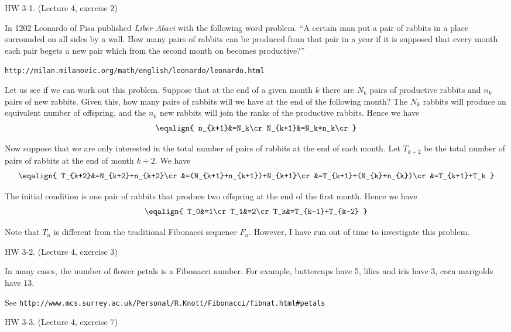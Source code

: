 \beginsection HW 3-1. (Lecture 4, exercise 2)

In 1202 Leonardo of Pisa published {\it Liber Abaci} with the following word problem.
\medskip
``A certain man put a pair of rabbits in a place surrounded on all sides by a wall.
How many pairs of rabbits can be produced from that pair in a year if it is supposed
that every month each pair begets a new pair which from the second month on becomes
productive?''

{\tt http://milan.milanovic.org/math/english/leonardo/leonardo.html}

\medskip
Let us see if we can work out this problem.
Suppose that at the end of a given month $k$ there are
$N_k$ pairs of productive rabbits and $n_k$ pairs of new rabbits.
Given this, how many pairs of rabbits will we have at the end of
the following month?
The $N_k$ rabbits will produce an equivalent number of offspring,
and the $n_k$ new rabbits will join the ranks of the productive rabbits.
Hence we have
$$\eqalign{
n_{k+1}&=N_k\cr
N_{k+1}&=N_k+n_k\cr
}$$

Now suppose that we are only interested in the total number of pairs of rabbits
at the end of each month.
Let $T_{k+2}$ be the total number of pairs of rabbits at the end of month $k+2$.
We have
$$\eqalign{
T_{k+2}&=N_{k+2}+n_{k+2}\cr
&=(N_{k+1}+n_{k+1})+N_{k+1}\cr
&=T_{k+1}+(N_{k}+n_{k})\cr
&=T_{k+1}+T_k
}$$

The initial condition is one pair of rabbits that produce
two offspring at the end of the first month.
Hence we have
$$\eqalign{
T_0&=1\cr
T_1&=2\cr
T_k&=T_{k-1}+T_{k-2}
}$$

Note that $T_n$ is different from the traditional Fibonacci sequence $F_n$.
However, I have run out of time to investigate this problem.


\beginsection HW 3-2. (Lecture 4, exercise 3)

%
In many cases, the number of flower petals is a Fibonacci number.
For example,
buttercups have 5, lilies and iris have 3, corn marigolds have 13.\par
\noindent See {\tt http://www.mcs.surrey.ac.uk/Personal/R.Knott/Fibonacci/fibnat.html\#petals}

\beginsection HW 3-3. (Lecture 4, exercise 7)

